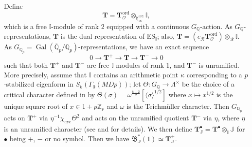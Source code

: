 \documentclass[a4paper,11pt]{amsart}
\numberwithin{equation}{section}
\theoremstyle{plain}
\theoremstyle{definition}
\theoremstyle{remark}
\newcommand{\Q}{\mathbb{Q}}
\newcommand{\Z}{\mathbb{Z}}
\newcommand{\I}{\mathbb{I}}
\newcommand{\J}{\mathbb{J}}
\DeclareMathOperator{\Gal}{Gal}
\newcommand{\cyc}{{\mathrm{cyc}}}
\newcommand{\ord}{\mathrm{ord}}
\newcommand{\ES}{\mathrm{ES}}
\begin{document}
{Define 
\begin{equation}\label{defT}
\mathbf{T}=\mathbf{T}^\ord_\mathcal{O}\otimes_{\mathfrak{h}_\infty^\ord}\I,\end{equation} which is a free $\I$-module 
of rank $2$ equipped with a continuous $G_{\Q}$-action. 
As $G_{\Q}$-representations, 
$\mathbf{T}$ is the dual representation of $\ES_\I$; also,
$\mathbf{T}=(e_\mathcal{R}\mathbf{T}^\ord_\mathcal{O})\otimes_\mathcal{R}\I$.
As $G_{\Q_p}=\Gal(\overline{\Q}_p/\Q_p)$-representations, 
we have an exact sequence \begin{equation}\label{filtration}
0\longrightarrow \mathbf{T}^+\longrightarrow  \mathbf{T}\longrightarrow\mathbf{T}^-\longrightarrow 0\end{equation}
such that both $\mathbf{T}^+$ and $\mathbf{T}^-$ are free $\I$-modules of rank $1$, and $\mathbf{T}^-$ is unramified. More precisely, assume that $\I$ contains an arithmetic point $\kappa$ corresponding to 
a $p$-stabilized eigenform in $S_k(\Gamma_0(MDp))$; 
let $\Theta\colon G_\Q\rightarrow\Lambda^\times$ be
the choice of a critical character defined in \cite[Definition 2.1.3]{Howard-Inv} by
$\Theta(\sigma)=\omega^\frac{k-2}{2}[\langle\sigma\rangle^{1/2}]$ where 
$x\mapsto x^{1/2}$ is the unique square root of $x\in 1+p\Z_p$ and $\omega$ is the Teichmüller character. 
Then $G_{\Q_p}$ acts on $ \mathbf{T}^+$ via 
{$\eta^{-1}\chi_\cyc\Theta^2$} and acts on the unramified quotient 
$\mathbf{T}^-$ via $\eta$, where $\eta$ is an unramified character 
(see \cite[\S5.5]{LV-MM} and \cite[Corollary 6.5]{LV-MM} for details). 
We then define $\mathbf{T}_\J^\bullet=\mathbf{T}^\bullet\otimes_\I\J$ for $\bullet$ being +, $-$ or 
no symbol. Then we have 
$\mathfrak{B}_\J^*(1)\simeq \mathbf{T}_\J^+$. 

}
\end{document}
